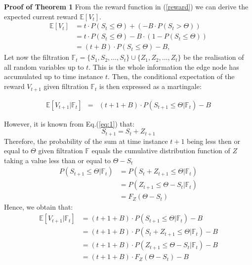 \documentclass{mpaper}
\begin{document}

\textbf{Proof of Theorem 1}
From the reward function in (\ref{reward}) we can derive the expected current reward $\mathbb{E}[V_t]$. 
\begin{equation}
\begin{split}
    \mathbb{E}[V_t] & = t \cdot P(S_t \leq \Theta) + (-B \cdot P(S_t > \Theta))\\
    & = t \cdot P(S_t \leq \Theta) - B \cdot (1 - P(S_t \leq \Theta))\\
    & = (t + B) \cdot P(S_t \leq \Theta) - B,
\end{split}
\end{equation}
Let now the filtration $\mathbb{F}_{t} = \{S_{1}, S_{2}, \ldots, S_{t}\} \cup \{Z_{1}, Z_{2}, \ldots, Z_{t}\}$ be the realisation of all random variables up to $t$. This is the whole information the edge node has accumulated up to time instance $t$. 
Then, the conditional expectation of the reward $V_{t+1}$ given filtration $\mathbb{F}_{t}$ is then expressed as a martingale:

\begin{eqnarray}
    \mathbb{E}[V_{t+1}|\mathbb{F}_{t}] & = & (t + 1 + B) \cdot P(S_{t+1} \leq \Theta | \mathbb{F}_t) - B
\end{eqnarray}

However, it is known from Eq.(\ref{eq:1}) that:
\begin{equation}
    S_{t+1} = S_t + Z_{t+1}
\end{equation}
Therefore, the probability of the sum at time instance $t+1$ being less then or equal to $\Theta$ given filtration $\mathbb{F}$ equals the cumulative distribution function of $Z$ taking a value less than or equal to $\Theta - S_t$ 
\begin{align*}
    P(S_{t+1} \leq \Theta | \mathbb{F}_t) &= P(S_t + Z_{t+1} \leq \Theta| \mathbb{F}_t)\\
                           &= P(Z_{t+1}\leq\Theta-S_t| \mathbb{F}_t)\\
                           &= F_{Z}(\Theta - S_t)
\end{align*}
Hence, we obtain that:
\begin{align*}
    \mathbb{E}[V_{t+1}|\mathbb{F}_{t}] &= (t + 1 + B) \cdot P(S_{t+1} \leq \Theta | \mathbb{F}_t) - B\\
    &=(t + 1 + B) \cdot P(S_{t}+Z_{t+1} \leq \Theta | \mathbb{F}_{t}) - B\\
    &=(t + 1 + B) \cdot P(Z_{t+1} \leq \Theta-S_{t} | \mathbb{F}_{t}) - B\\
    &=(t + 1 + B) \cdot F_{Z}(\Theta-S_{t}) - B\\
\end{align*}
\end{document}

